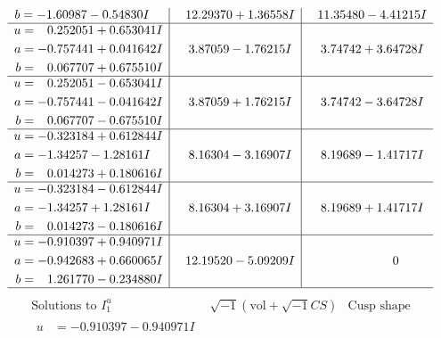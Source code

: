 \documentclass[1p]{elsarticle_modified}
\theoremstyle{definition}
\newcommand{\I}{\sqrt{-1}}
\begin{document}
$$\begin{array}{c|c|c}
\begin{aligned}
b &= -1.60987 - 0.54830 I\end{aligned}
 & \phantom{-}12.29370 + 1.36558 I & \phantom{-}11.35480 - 4.41215 I \\ \hline\begin{aligned}
u &= \phantom{-}0.252051 + 0.653041 I \\
a &= -0.757441 + 0.041642 I \\
b &= \phantom{-}0.067707 + 0.675510 I\end{aligned}
 & \phantom{-}3.87059 - 1.76215 I & \phantom{-}3.74742 + 3.64728 I \\ \hline\begin{aligned}
u &= \phantom{-}0.252051 - 0.653041 I \\
a &= -0.757441 - 0.041642 I \\
b &= \phantom{-}0.067707 - 0.675510 I\end{aligned}
 & \phantom{-}3.87059 + 1.76215 I & \phantom{-}3.74742 - 3.64728 I \\ \hline\begin{aligned}
u &= -0.323184 + 0.612844 I \\
a &= -1.34257 - 1.28161 I \\
b &= \phantom{-}0.014273 + 0.180616 I\end{aligned}
 & \phantom{-}8.16304 - 3.16907 I & \phantom{-}8.19689 - 1.41717 I \\ \hline\begin{aligned}
u &= -0.323184 - 0.612844 I \\
a &= -1.34257 + 1.28161 I \\
b &= \phantom{-}0.014273 - 0.180616 I\end{aligned}
 & \phantom{-}8.16304 + 3.16907 I & \phantom{-}8.19689 + 1.41717 I \\ \hline\begin{aligned}
u &= -0.910397 + 0.940971 I \\
a &= -0.942683 + 0.660065 I \\
b &= \phantom{-}1.261770 - 0.234880 I\end{aligned}
 & \phantom{-}12.19520 - 5.09209 I & \phantom{-0.000000 } 0\\
 \hline 
 \end{array}$$\newpage$$\begin{array}{c|c|c}  
\text{Solutions to }I^u_{1}& \I (\text{vol} + \sqrt{-1}CS) & \text{Cusp shape}\\
 \hline 
\begin{aligned}
u &= -0.910397 - 0.940971 I \\

\end{aligned}
\end{array}$$
\end{document}
